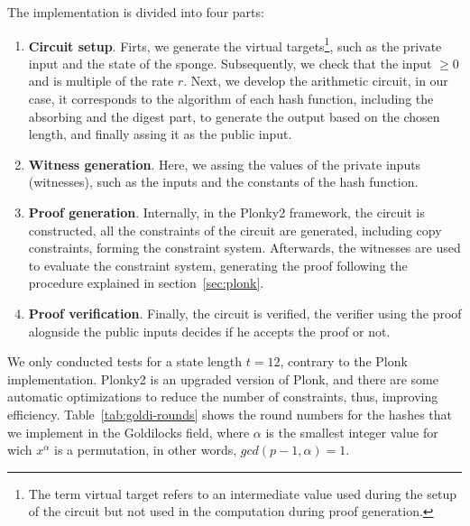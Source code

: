 The implementation is divided into four parts:
\begin{enumerate}
  \item \textbf{Circuit setup}. Firts, we generate the virtual targets\footnote{The term virtual target refers to an intermediate value used during the setup of the circuit but not used in the computation during proof generation.}, such as the private input and the state of the sponge. Subsequently, we check that the input $\geq0$ and is multiple of the rate $r$. Next, we develop the arithmetic circuit, in our case, it corresponds to the algorithm of each hash function, including the absorbing and the digest part, to generate the output based on the chosen length, and finally assing it as the public input.
  \item \textbf{Witness generation}. Here, we assing the values of the private inputs (witnesses), such as the inputs and the constants of the hash function.
  \item \textbf{Proof generation}. Internally, in the Plonky2 framework, the circuit is constructed, all the constraints of the circuit are generated, including copy constraints, forming the constraint system. Afterwards, the witnesses are used to evaluate the constraint system, generating the proof following the procedure explained in section~\ref{sec:plonk}.
  \item \textbf{Proof verification}. Finally, the circuit is verified, the verifier using the proof alognside the public inputs decides if he accepts the proof or not.
\end{enumerate}

We only conducted tests for a state length $t=12$, contrary to the Plonk implementation. Plonky2 is an upgraded version of Plonk, and there are some automatic optimizations to reduce the number of constraints, thus, improving efficiency. Table~\ref{tab:goldi-rounds} shows the round numbers for the hashes that we implement in the Goldilocks field, where $\alpha$ is the smallest integer value for wich $x^\alpha$ is a permutation, in other words, $gcd(p-1,\alpha)=1$.

